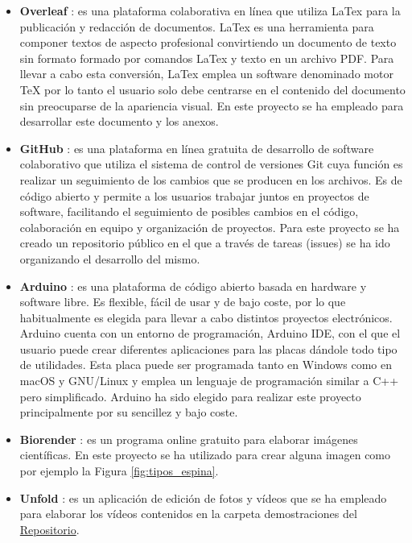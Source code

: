 \begin{itemize}
    \item \textbf{Overleaf} \cite{overleaf}: es una plataforma colaborativa en línea que utiliza LaTex para la publicación y redacción de documentos. LaTex es una herramienta para componer textos de aspecto profesional convirtiendo un documento de texto sin formato formado por comandos LaTex y texto en un archivo PDF. Para llevar a cabo esta conversión, LaTex emplea un software denominado motor TeX por lo tanto el usuario solo debe centrarse en el contenido del documento sin preocuparse de la apariencia visual. En este proyecto se ha empleado para desarrollar este documento y los anexos.
    
    \item \textbf{GitHub} \cite{github}: es una plataforma en línea gratuita de desarrollo de software colaborativo que utiliza el sistema de control de versiones Git cuya función es realizar un seguimiento de los cambios que se producen en los archivos. Es de código abierto y permite a los usuarios trabajar juntos en proyectos de software, facilitando el seguimiento de posibles cambios en el código, colaboración en equipo y organización de proyectos. Para este proyecto se ha creado un repositorio público en el que a través de tareas (issues) se ha ido organizando el desarrollo del mismo.
    
    \item \textbf{Arduino} \cite{arduino}: es una plataforma de código abierto basada en hardware y software libre. Es flexible, fácil de usar y de bajo coste, por lo que habitualmente es elegida para llevar a cabo distintos proyectos electrónicos. Arduino cuenta con un entorno de programación, Arduino IDE, con el que el usuario puede crear diferentes aplicaciones para las placas dándole todo tipo de utilidades. Esta placa puede ser programada tanto en Windows como en macOS y GNU/Linux y emplea un lenguaje de programación similar a C++ pero simplificado. Arduino ha sido elegido para realizar este proyecto principalmente por su sencillez y bajo coste.
    
    \item \textbf{Biorender} \cite{biorender}: es un programa online gratuito para elaborar imágenes científicas. En este proyecto se ha utilizado para crear alguna imagen como por ejemplo la Figura \ref{fig:tipos_espina}.

    \item \textbf{Unfold} \cite{unfold}: es un aplicación de edición de fotos y vídeos que se ha empleado para elaborar los vídeos contenidos en la carpeta demostraciones del \href{https://github.com/CeliaValladolid/TFG_Valvula_Derivacion_VentriculoPeritoneal}{Repositorio}.
    
\end{itemize}

